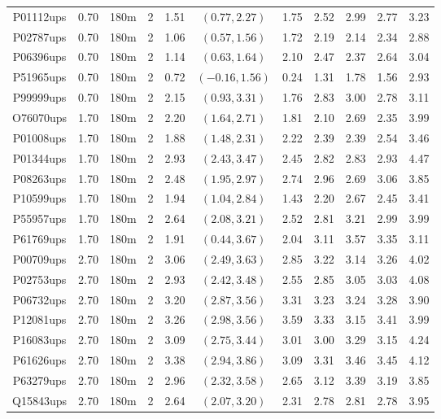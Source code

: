 \begin{landscape}
\begin{longtable}{cccc|cc|ccccc}
  P01112ups & 0.70 & 180m &   2 & 1.51 & $(0.77, 2.27)$ & 1.75 & 2.52 & 2.99 & 2.77 & 3.23 \\ 
  P02787ups & 0.70 & 180m &   2 & 1.06 & $(0.57, 1.56)$ & 1.72 & 2.19 & 2.14 & 2.34 & 2.88 \\ 
  P06396ups & 0.70 & 180m &   2 & 1.14 & $(0.63, 1.64)$ & 2.10 & 2.47 & 2.37 & 2.64 & 3.04 \\ 
  P51965ups & 0.70 & 180m &   2 & 0.72 & $(-0.16, 1.56)$ & 0.24 & 1.31 & 1.78 & 1.56 & 2.93 \\ 
  P99999ups & 0.70 & 180m &   2 & 2.15 & $(0.93, 3.31)$ & 1.76 & 2.83 & 3.00 & 2.78 & 3.11 \\ 
  O76070ups & 1.70 & 180m &   2 & 2.20 & $(1.64, 2.71)$ & 1.81 & 2.10 & 2.69 & 2.35 & 3.99 \\ 
  P01008ups & 1.70 & 180m &   2 & 1.88 & $(1.48, 2.31)$ & 2.22 & 2.39 & 2.39 & 2.54 & 3.46 \\ 
  P01344ups & 1.70 & 180m &   2 & 2.93 & $(2.43, 3.47)$ & 2.45 & 2.82 & 2.83 & 2.93 & 4.47 \\ 
  P08263ups & 1.70 & 180m &   2 & 2.48 & $(1.95, 2.97)$ & 2.74 & 2.96 & 2.69 & 3.06 & 3.85 \\ 
  P10599ups & 1.70 & 180m &   2 & 1.94 & $(1.04, 2.84)$ & 1.43 & 2.20 & 2.67 & 2.45 & 3.41 \\ 
  P55957ups & 1.70 & 180m &   2 & 2.64 & $(2.08, 3.21)$ & 2.52 & 2.81 & 3.21 & 2.99 & 3.99 \\ 
  P61769ups & 1.70 & 180m &   2 & 1.91 & $(0.44, 3.67)$ & 2.04 & 3.11 & 3.57 & 3.35 & 3.11 \\ 
  P00709ups & 2.70 & 180m &   2 & 3.06 & $(2.49, 3.63)$ & 2.85 & 3.22 & 3.14 & 3.26 & 4.02 \\ 
  P02753ups & 2.70 & 180m &   2 & 2.93 & $(2.42, 3.48)$ & 2.55 & 2.85 & 3.05 & 3.03 & 4.08 \\ 
  P06732ups & 2.70 & 180m &   2 & 3.20 & $(2.87, 3.56)$ & 3.31 & 3.23 & 3.24 & 3.28 & 3.90 \\ 
  P12081ups & 2.70 & 180m &   2 & 3.26 & $(2.98, 3.56)$ & 3.59 & 3.33 & 3.15 & 3.41 & 3.99 \\ 
  P16083ups & 2.70 & 180m &   2 & 3.09 & $(2.75, 3.44)$ & 3.01 & 3.00 & 3.29 & 3.15 & 4.24 \\ 
  P61626ups & 2.70 & 180m &   2 & 3.38 & $(2.94, 3.86)$ & 3.09 & 3.31 & 3.46 & 3.45 & 4.12 \\ 
  P63279ups & 2.70 & 180m &   2 & 2.96 & $(2.32, 3.58)$ & 2.65 & 3.12 & 3.39 & 3.19 & 3.85 \\ 
  Q15843ups & 2.70 & 180m &   2 & 2.64 & $(2.07, 3.20)$ & 2.31 & 2.78 & 2.81 & 2.78 & 3.95 \\ 

\end{longtable}
\end{landscape}
